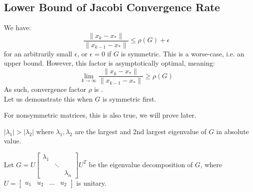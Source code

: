 \documentclass[../main/main.tex]{subfiles}
\begin{document}
\subsection{Lower Bound of Jacobi Convergence Rate} We have: \[
\frac{\|x_{k}- x_{*}\|}{\|x_{k-1}-x_{*}\|}  \leq \rho(G)+\epsilon
\] for an arbitrarily small $\epsilon$, or $\epsilon = 0$ if $G$ is symmetric.
This is a worse-case, i.e. an upper bound. However, this factor is asymptotically optimal, meaning: \[
  \lim_{k \to \infty} \frac{\|x_{k}-x_{*}\|}{\|x_{k-1}-x_{*}\|}  \geq \rho(G)
\]
As such, convergence factor  $\rho$ is .\\

Let us demonstrate this when $G$ is symmetric first.
\begin{remark}
For nonsymmetric matrices, this is also true, we will prove later.
\end{remark}
$|\lambda_{1}|> |\lambda_{2}|$ where $\lambda_{1},\lambda_{2}$ are the largest and 2nd largest eigenvalue of $G$ in absolute value.

Let $G = U \begin{bmatrix}
  \lambda_{1} && \\
  & \ddots & \\
  && \lambda_{n}
\end{bmatrix}U^{T}$ be the eigenvalue decomposition of $G$, where $U = \begin{bmatrix}
u_{1}&u_{2}&\ldots& u_{2}
\end{bmatrix}$ is unitary. \\
\end{document}
